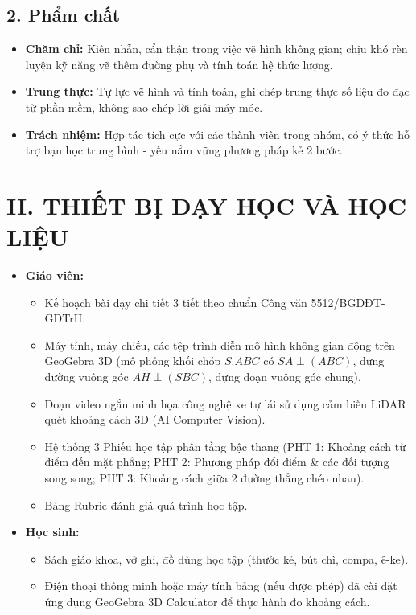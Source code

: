 \documentclass[12pt, a4paper]{article}
\begin{document}
\subsection*{2. Phẩm chất}

\begin{itemize}[leftmargin=1.2cm]
    \item \textbf{Chăm chỉ:} Kiên nhẫn, cẩn thận trong việc vẽ hình không gian; chịu khó rèn luyện kỹ năng vẽ thêm đường phụ và tính toán hệ thức lượng.
    \item \textbf{Trung thực:} Tự lực vẽ hình và tính toán, ghi chép trung thực số liệu đo đạc từ phần mềm, không sao chép lời giải máy móc.
    \item \textbf{Trách nhiệm:} Hợp tác tích cực với các thành viên trong nhóm, có ý thức hỗ trợ bạn học trung bình - yếu nắm vững phương pháp kẻ 2 bước.
\end{itemize}

\section*{II. THIẾT BỊ DẠY HỌC VÀ HỌC LIỆU}

\begin{itemize}[leftmargin=1.2cm]
    \item \textbf{Giáo viên:}
    \begin{itemize}[leftmargin=0.6cm]
        \item Kế hoạch bài dạy chi tiết 3 tiết theo chuẩn Công văn 5512/BGDĐT-GDTrH.
        \item Máy tính, máy chiếu, các tệp trình diễn mô hình không gian động trên GeoGebra 3D (mô phỏng khối chóp $S.ABC$ có $SA \perp (ABC)$, dựng đường vuông góc $AH \perp (SBC)$, dựng đoạn vuông góc chung).
        \item Đoạn video ngắn minh họa công nghệ xe tự lái sử dụng cảm biến LiDAR quét khoảng cách 3D (AI Computer Vision).
        \item Hệ thống 3 Phiếu học tập phân tầng bậc thang (PHT 1: Khoảng cách từ điểm đến mặt phẳng; PHT 2: Phương pháp đổi điểm & các đối tượng song song; PHT 3: Khoảng cách giữa 2 đường thẳng chéo nhau).
        \item Bảng Rubric đánh giá quá trình học tập.
    \end{itemize}

    \item \textbf{Học sinh:}
    \begin{itemize}[leftmargin=0.6cm]
        \item Sách giáo khoa, vở ghi, đồ dùng học tập (thước kẻ, bút chì, compa, ê-ke).
        \item Điện thoại thông minh hoặc máy tính bảng (nếu được phép) đã cài đặt ứng dụng GeoGebra 3D Calculator để thực hành đo khoảng cách.
    \end{itemize}
\end{itemize}
\end{document}
